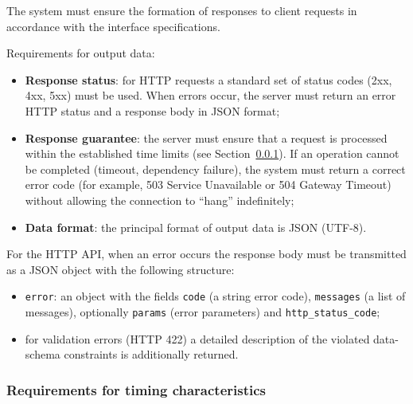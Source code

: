 \documentclass[12pt,a4paper]{extarticle}
\begin{document}
\begin{hseExample}
The system must ensure the formation of responses to client requests in accordance with the interface specifications.

Requirements for output data:
\begin{itemize}[nosep, leftmargin=1.25cm]
    \item \textbf{Response status}: for HTTP requests a standard set of status codes (2xx, 4xx, 5xx) must be used. When errors occur, the server must return an error HTTP status and a response body in JSON format;
    \item \textbf{Response guarantee}: the server must ensure that a request is processed within the established time limits (see Section~\ref{sec:temporal_reqs}). If an operation cannot be completed (timeout, dependency failure), the system must return a correct error code (for example, 503 Service Unavailable or 504 Gateway Timeout) without allowing the connection to \enquote{hang} indefinitely;
    \item \textbf{Data format}: the principal format of output data is JSON (UTF-8).
\end{itemize}

For the HTTP API, when an error occurs the response body must be transmitted as a JSON object with the following structure:
\begin{itemize}[nosep, leftmargin=1.25cm]
    \item \texttt{error}: an object with the fields \texttt{code} (a string error code), \texttt{messages} (a list of messages), optionally \texttt{params} (error parameters) and \texttt{http\_status\_code};
    \item for validation errors (HTTP 422) a detailed description of the violated data-schema constraints is additionally returned.
\end{itemize}
\end{hseExample}

\subsubsection{Requirements for timing characteristics}
\label{sec:temporal_reqs}
\end{document}
